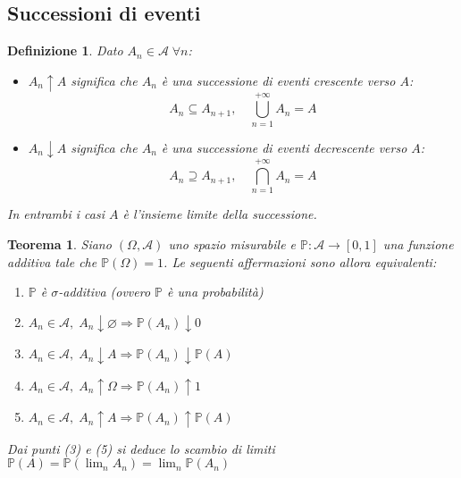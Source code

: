 \documentclass[a4paper,12pt]{article}
\theoremstyle{break}
\newtheorem{theorem}{Teorema}[section]
\newtheorem{definition}{Definizione}[section]
\let\emptyset\varnothing
\numberwithin{equation}{section}
\begin{document}
\subsection{Successioni di eventi}
\begin{definition}
  Dato \(A_n \in \mathcal{A} \; \forall n\):
  \begin{itemize}
    \item \(A_n \uparrow A\) significa che \(A_n\) è una successione di eventi crescente verso \(A\):
    \[
      A_n \subseteq A_{n+1}, \quad \bigcup_{n=1}^{+\infty} A_n = A
    \]
    \item \(A_n \downarrow A\) significa che \(A_n\) è una successione di eventi decrescente verso \(A\):
    \[
      A_n \supseteq A_{n+1}, \quad \bigcap_{n=1}^{+\infty} A_n = A
    \]
  \end{itemize}
  In entrambi i casi \(A\) è l'insieme limite della successione.
\end{definition}
\begin{theorem}
  Siano \((\Omega, \mathcal{A})\) uno spazio misurabile e \(\mathbb{P} : \mathcal{A} \rightarrow [0, 1]\) una funzione additiva tale che \(\mathbb{P}(\Omega) = 1\). Le seguenti affermazioni sono allora equivalenti:
  \begin{enumerate}
    \item \(\mathbb{P}\) è \(\sigma\)-additiva (ovvero \(\mathbb{P}\) è una probabilità)
    \item \(A_n \in \mathcal{A}, \; A_n \downarrow \emptyset \Longrightarrow \mathbb{P}(A_n) \downarrow 0\)
    \item \(A_n \in \mathcal{A}, \; A_n \downarrow A \Longrightarrow \mathbb{P}(A_n) \downarrow \mathbb{P}(A)\)
    \item \(A_n \in \mathcal{A}, \; A_n \uparrow \Omega \Longrightarrow \mathbb{P}(A_n) \uparrow 1\)
    \item \(A_n \in \mathcal{A}, \; A_n \uparrow A \Longrightarrow \mathbb{P}(A_n) \uparrow \mathbb{P}(A)\)
  \end{enumerate}
Dai punti (3) e (5) si deduce lo scambio di limiti \(\mathbb{P}(A) = \mathbb{P}(\lim_n A_n) = \lim_n \mathbb{P}(A_n)\)
\end{theorem}
\end{document}
